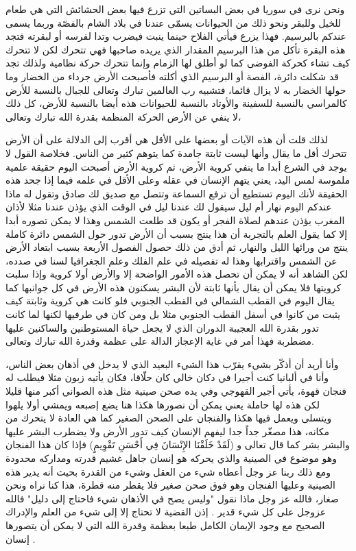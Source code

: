 ونحن نرى في سوريا في بعض البساتين التي تزرع فيها بعض الحشائش التي هي طعام للخيل وللبقر ونحو ذلك من الحيوانات يسمّى عندنا في بلاد الشام بالفصّة وربما يسمى عندكم بالبرسيم. فهذا يزرع فيأتي الفلاح حينما ينبت فيضرب وتدا لفرسه أو لبقرته فتجد هذه البقرة تأكل من هذا البرسيم المقدار الذي يريده صاحبها فهي تتحرك لكن لا تتحرك كيف تشاء كحركة الفوضى كما لو أطلق لها الزمام وإنما تتحرك حركة نظامية ولذلك تجد قد شكلت دائرة، الفصة أو البرسيم الذي أكلته فأصبحت الأرض جرداء من الخضار وما حولها الخضار به لا يزال قائما، فتشبيه رب العالمين تبارك وتعالى للجبال بالنسبة للأرض كالمراسي بالنسبة للسفينة والأوتاد بالنسبة للحيوانات هذه أيضا بالنسبة للأرض، كل ذلك لا ينفي عن الأرض الحركة المنظمة بقدرة الله تبارك وتعالى، 

لذلك قلت أن هذه الآيات أو بعضها على الأقل هي أقرب إلى الدلالة على أن الأرض تتحرك أقل ما يقال وأنها ليست ثابتة جامدة كما يتوهم كثير من الناس.
فخلاصة القول لا يوجد في الشرع أبدا ما ينفي كروية الأرض، ثم كروية الأرض أصبحت اليوم حقيقة علمية ملموسة لمس اليد، يعني يتهم الإنسان في عقله وعلى الأقل في علمه فيما إذا جحد هذه الحقيقة لأنك اليوم تستطيع أن ترفع السماعة وتتصل مع صديق لك صادق وتقول له ماذا عندكم اليوم نهار أم ليل سيقول لك عندنا ليل في الوقت الذي يؤذن عندنا مثلا لأذان المغرب يؤذن عندهم لصلاة الفجر أو يكون قد طلعت الشمس وهذا لا يمكن تصوره أبدا إلا كما يقول العلم بالتجربة أن هذا ينتج بسبب أن الأرض تدور حول الشمس دائرة كاملة ينتج من ورائها الليل والنهار، ثم أدق من ذلك حصول الفصول الأربعة بسبب ابتعاد الأرض عن الشمس واقترابها وهذا له تفصيله في علم الفلك وعلم الجغرافيا لسنا في صدده، لكن الشاهد أنه لا يمكن أن تحصل هذه الأمور الواضحة إلا والأرض أولا كروية وإذا سلبت كرويتها فلا يمكن أن يقال بأنها ثابتة لأن البشر يسكنون هذه الأرض في كل جوانبها كما يقال اليوم في القطب الشمالي في القطب الجنوبي فلو كانت هي كروية وثابتة كيف يثبت من كانوا في أسفل القطب الجنوبي مثلا بل ومن كان في طرفيها لكنها لما كانت تدور بقدرة الله العجيبة الدوران الذي لا يجعل حياة المستوطنين والساكنين عليها مضطربة فهذا أمر في غاية الإعجاز الدالة على عظمة وقدرة الله تبارك وتعالى.

وأنا أريد أن أذكّر بشيء يقرّب هذا الشيء البعيد الذي لا يدخل في أذهان بعض الناس، وأنا في ألبانيا كنت أجيرا في دكان خالي كان حلّاقا، فكان يأتيه زبون مثلا فيطلب له فنجان قهوة، يأتي أجير القهوجي وفي يده صحن صينية مثل هذه الصواني أكبر منها قليلا لكن هذه لها حاملة يعني يمكن أن نصورها هكذا هنا يضع إصبعه ويمشي أولا يلهوا ويتسلى ويعمل فيها هكذا والفنجان على الصحن الصغير كما هي العادة لا يتحرك من مكانه، هذا مصغّر جداً جدا ليفهم الإنسان كيف تدور الأرض ولا يضطرب البشر عليها والبشر بشر كما قال تعالى و (لَقَدْ خَلَقْنَا الإِنْسَانَ فِي أَحْسَنِ تَقْوِيمٍ) فإذا كان هذا الفنجان وهو موضوع في الصينية والذي يحركه هو إنسان جاهل غشيم قدرته ومداركه محدودة ومع ذلك ربنا عز وجل أعطاه شيء من العقل وشيء من القدرة بحيث أنه يدير هذه الصينية وعليها الفنجان وهو فوق صحن صغير فلا يقطر منه قطرة، هذا كنا نراه ونحن صغار، فالله عز وجل ماذا نقول "وليس يصح في الأذهان شيء فاحتاج إلى دليل" فالله عزوجل على كل شيء قدير .
إذن القضية لا تحتاج إلا إلى شيء من العلم والإدراك الصحيح مع وجود الإيمان الكامل طبعا بعظمة وقدرة الله التي لا يمكن أن يتصورها إنسان \href{https://alathar.net/home/esound/index.php?op=codevi&coid=155590}{\faExternalLink} \href{https://shamela.ws/book/36190/3337#p8}{\faExternalLink}.

